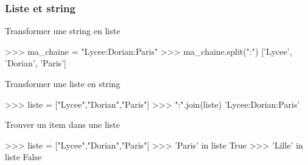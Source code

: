 \begin{frame}[fragile]
\frametitle{Liste et string}

\begin{minipage}[t]{0.38\linewidth}
Transformer une string en liste
\end{minipage}\hfill
\begin{minipage}[t]{0.58\linewidth}
\vspace{-0.5cm}
\begin{GrayBox}[0.85\textwidth]
\begin{verbatimtab}[3]
>>> ma_chaine = "Lycee:Dorian:Paris"
>>> ma_chaine.split(":")
['Lycee', 'Dorian', 'Paris']
\end{verbatimtab}
\end{GrayBox}
\end{minipage}

\begin{minipage}[t]{0.38\linewidth}
Transformer une liste en string
\end{minipage}\hfill
\begin{minipage}[t]{0.58\linewidth}
\vspace{-0.5cm}
\begin{GrayBox}[0.85\textwidth]
\begin{verbatimtab}[3]
>>> liste = ["Lycee","Dorian","Paris"]
>>> ":".join(liste)
'Lycee:Dorian:Paris'
\end{verbatimtab}
\end{GrayBox}
\end{minipage}

\begin{minipage}[t]{0.38\linewidth}
Trouver un item dans une liste
\end{minipage}\hfill
\begin{minipage}[t]{0.58\linewidth}
\vspace{-0.5cm}
\begin{GrayBox}[0.85\textwidth]
\begin{verbatimtab}[3]
>>> liste = ["Lycee","Dorian","Paris"]
>>> 'Paris' in liste
True
>>> 'Lille' in liste
False
\end{verbatimtab}
\end{GrayBox}
\end{minipage}
\end{frame}

